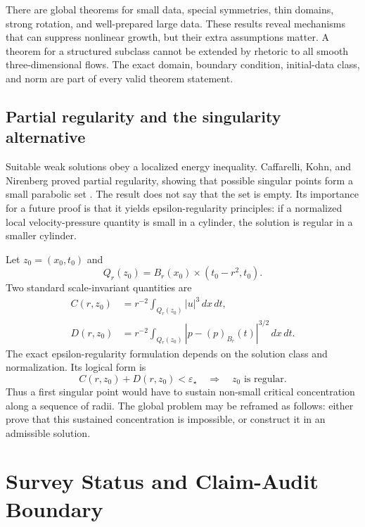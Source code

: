 \documentclass[conference]{../../../../Conference-LaTeX-template_10-17-19/IEEEtran}
\begin{document}
There are global theorems for small data, special symmetries, thin domains, strong rotation, and well-prepared large data. These results reveal mechanisms that can suppress nonlinear growth, but their extra assumptions matter. A theorem for a structured subclass cannot be extended by rhetoric to all smooth three-dimensional flows. The exact domain, boundary condition, initial-data class, and norm are part of every valid theorem statement.

\subsection{Partial regularity and the singularity alternative}
Suitable weak solutions obey a localized energy inequality. Caffarelli, Kohn, and Nirenberg proved partial regularity, showing that possible singular points form a small parabolic set \cite{ckn}. The result does not say that the set is empty. Its importance for a future proof is that it yields epsilon-regularity principles: if a normalized local velocity-pressure quantity is small in a cylinder, the solution is regular in a smaller cylinder.

Let $z_0=(x_0,t_0)$ and
\begin{equation}
Q_r(z_0)=B_r(x_0)\times(t_0-r^2,t_0).
\end{equation}
Two standard scale-invariant quantities are
\begin{align}
C(r,z_0)&=r^{-2}\int_{Q_r(z_0)}|u|^3\,dx\,dt, \label{eq:C}\\
D(r,z_0)&=r^{-2}\int_{Q_r(z_0)}
|p-(p)_{B_r}(t)|^{3/2}\,dx\,dt. \label{eq:D}
\end{align}
The exact epsilon-regularity formulation depends on the solution class and normalization. Its logical form is
\begin{equation}
C(r,z_0)+D(r,z_0)<\varepsilon_\star
\quad\Longrightarrow\quad
z_0\text{ is regular}.
\label{eq:epsilon}
\end{equation}
Thus a first singular point would have to sustain non-small critical concentration along a sequence of radii. The global problem may be reframed as follows: either prove that this sustained concentration is impossible, or construct it in an admissible solution.

\section{Survey Status and Claim-Audit Boundary}
\end{document}
